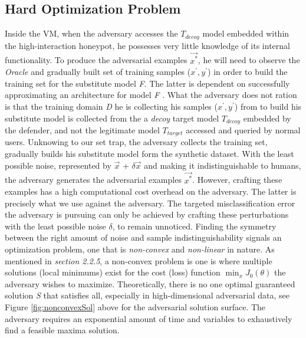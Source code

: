 \documentclass[grad,lot,lof,11pt,oneside,onehalfspace]{RUthesis}
\begin{document}
\subsection{Hard Optimization Problem}
Inside the VM, when the adversary accesses the \textit{$T_{decoy}$} model embedded within the high-interaction honeypot, he possesses very little knowledge of its internal functionality. To produce the adversarial examples \textit{$\vec{x^{*}}$}, he will need to observe the \textit{Oracle} and gradually built set of training samples ($x^{'},y^{'}$) in order to build the training set for the substitute model \textit{F}. The latter is dependent on successfully approximating an architecture for model \textit{F} . What the adversary does not ration is that the training domain \textit{D} he is collecting his samples ($x^{'},y^{'}$) from to build his substitute model is collected from the a \textit{decoy} target model \textit{$T_{decoy}$} embedded by the defender, and not the legitimate model \textit{$T_{target}$} accessed and queried by normal users.
Unknowing to our set trap, the adversary collects the training set, gradually builds his substitute model form the synthetic dataset. With the least possible noise, represented by $\vec{x}$ + $\delta\vec{x}$ and making it indistinguishable to humans, the adversary generates the adversarial examples \textit{$\vec{x^{*}}$}. However, crafting these examples has a high computational cost overhead on the adversary. The latter is precisely what we use against the adversary. The targeted misclassification error the adversary is pursuing can only be achieved by crafting these perturbations with the least possible noise $\delta$, to remain unnoticed. Finding the symmetry between the right amount of noise and sample indistinguishability signals an optimization problem, one that is \textit{non-convex} and \textit{non-linear} in nature. 
As mentioned in \textit{section 2.2.5}, a non-convex problem is one is where multiple solutions (local minimums) exist for the cost (loss) function $\min_{x} J_{0}(\theta)$ the adversary wishes to maximize. Theoretically, there is no one optimal guaranteed solution \textit{S} that satisfies all, especially in high-dimensional adversarial data, see Figure \ref {fig:nonconvexSol} above for the adversarial solution surface. The adversary requires an exponential amount of time and variables to exhaustively find a feasible maxima solution. 
\end{document}

